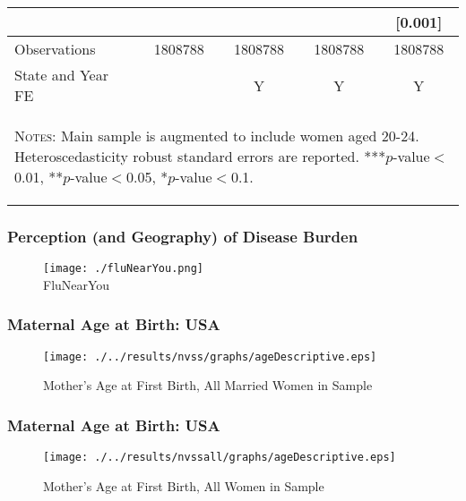 \documentclass[10pt,letterpaper,subeqn]{beamer}
\begin{document}
\begin{frame}[label=selecYoung]
\begin{table}[htbp]
{\begin{tabular}{l*{4}{c}}
        &               &               &               &     [0.001]   \\
        \midrule
        Observations        &     1808788   &     1808788   &     1808788   &     1808788   \\
        State and Year FE&&Y&Y&Y\\  \bottomrule
        \multicolumn{5}{p{16.4cm}}{\begin{footnotesize}  \textsc{Notes:}  Main sample is augmented to include women aged 20-24. Heteroscedasticity robust standard errors are reported.
            ***$p$-value$<$0.01, **$p$-value$<$0.05, *$p$-value$<$0.1.
  \end{footnotesize}}\end{tabular}}\end{table}
\hyperlink{SOBcorr}{}
\end{frame}


  
\begin{frame}[label=flu]
\frametitle{Perception (and Geography) of Disease Burden}
\begin{figure}[htpb!]
  \centering
  \texttt{[image: ./fluNearYou.png]} \\
{\footnotesize FluNearYou}
\end{figure}
\hyperlink{perceptions}{}
\end{frame}

\begin{frame}[label=ageHist]
\frametitle{Maternal Age at Birth: USA}
\begin{figure}[htpb!]
\begin{center}
  \centering
  \caption{Mother's Age at First Birth, All Married Women in Sample}
  \texttt{[image: ./../results/nvss/graphs/ageDescriptive.eps]}
  \label{fig:NVSSbirths}
\end{center}
\end{figure}
\vspace{-5mm}
\end{frame}

\begin{frame}[label=ageHist2]
\frametitle{Maternal Age at Birth: USA}
\begin{figure}[htpb!]
\begin{center}
  \centering
  \caption{Mother's Age at First Birth, All Women in Sample}
  \texttt{[image: ./../results/nvssall/graphs/ageDescriptive.eps]}
  \label{fig:NVSSbirthsAll}
\end{center}
\end{figure}
\vspace{-5mm}
\hyperlink{Data}{}
\end{frame}
\end{document}
